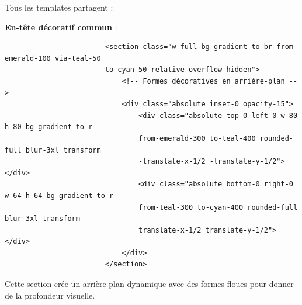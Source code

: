 \documentclass[a4paper,11pt]{article}
\begin{document}
                \noindent Tous les templates partagent :

                \textbf{En-tête décoratif commun} :
                \begin{tcolorbox}[colback=lightgray!6, colframe=black, left=-45mm, right=5mm, top=2mm, bottom=0mm, boxrule=0.1mm]
                    \begin{verbatim}
                        <section class="w-full bg-gradient-to-br from-emerald-100 via-teal-50 
                        to-cyan-50 relative overflow-hidden">
                            <!-- Formes décoratives en arrière-plan -->
                            <div class="absolute inset-0 opacity-15">
                                <div class="absolute top-0 left-0 w-80 h-80 bg-gradient-to-r 
                                from-emerald-300 to-teal-400 rounded-full blur-3xl transform 
                                -translate-x-1/2 -translate-y-1/2"></div>
                                <div class="absolute bottom-0 right-0 w-64 h-64 bg-gradient-to-r 
                                from-teal-300 to-cyan-400 rounded-full blur-3xl transform 
                                translate-x-1/2 translate-y-1/2"></div>
                            </div>
                        </section>
                    \end{verbatim}
                \end{tcolorbox}

                \noindent Cette section crée un arrière-plan dynamique avec des formes floues pour donner de la profondeur visuelle.
\end{document}
